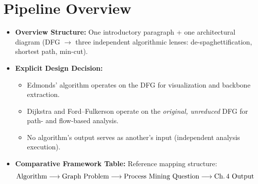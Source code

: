 
\section{Pipeline Overview}
\begin{itemize}[leftmargin=*]
	\item \textbf{Overview Structure:} One introductory paragraph + one architectural diagram (DFG $\rightarrow$ three independent algorithmic lenses: de-spaghettification, shortest path, min-cut).
	\item \textbf{Explicit Design Decision:}
	\begin{itemize}
		\item Edmonds' algorithm operates on the DFG for visualization and backbone extraction.
		\item Dijkstra and Ford--Fulkerson operate on the \emph{original, unreduced} DFG for path- and flow-based analysis.
		\item No algorithm's output serves as another's input (independent analysis execution).
	\end{itemize}
	\item \textbf{Comparative Framework Table:} Reference mapping structure:
	\[
	\text{Algorithm} \longrightarrow \text{Graph Problem} \longrightarrow \text{Process Mining Question} \longrightarrow \text{Ch.\,4 Output}
	\]
\end{itemize}

